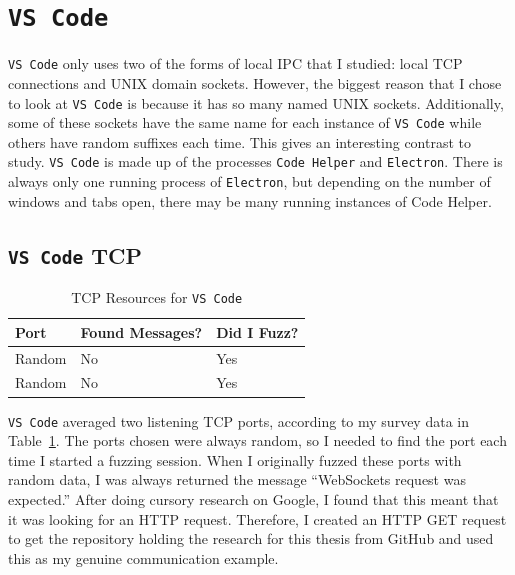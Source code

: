 \section{\texttt{VS Code}}
\label{sec:code}
\texttt{VS Code} only uses two of the forms of local IPC that I studied: local TCP connections and UNIX domain sockets.  However, the biggest reason that I chose to look at \texttt{VS Code} is because it has so many named UNIX sockets.  Additionally, some of these sockets have the same name for each instance of \texttt{VS Code} while others have random suffixes each time.  This gives an interesting contrast to study.  \texttt{VS Code} is made up of the processes \texttt{Code Helper} and \texttt{Electron}.  There is always only one running process of \texttt{Electron}, but depending on the number of windows and tabs open, there may be many running instances of Code Helper.

\subsection{\texttt{VS Code} TCP}
\label{sec:codeTcp}

\begin{table}
\centering
\begin{normalsize}
\begin{tabular}{ l | l | l }
\textbf{Port} & \textbf{Found Messages?} & \textbf{Did I Fuzz?} \\ \hline
Random & No & Yes \\ \hline
Random & No & Yes \\ \hline
\end{tabular}
\caption{TCP Resources for \texttt{VS Code}}
\label{tab:vsCodeTcpTab}
\end{normalsize}
\end{table}

\texttt{VS Code} averaged two listening TCP ports, according to my survey data in Table~\ref{tab:vsCodeTcpTab}.  The ports chosen were always random, so I needed to find the port each time I started a fuzzing session.  When I originally fuzzed these ports with random data, I was always returned the message ``WebSockets request was expected.''  After doing cursory research on Google, I found that this meant that it was looking for an HTTP request.  Therefore, I created an HTTP GET request to get the repository holding the research for this thesis from GitHub and used this as my genuine communication example.

